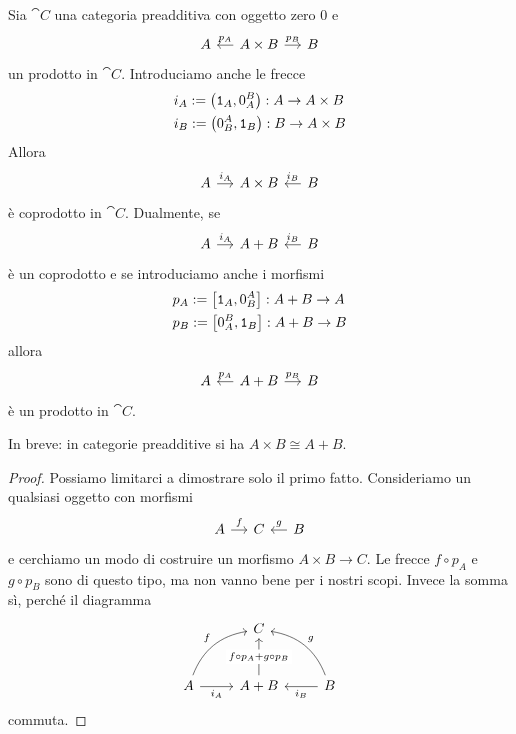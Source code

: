 \begin{proposition}\label{proposition:BinProdsAreBinCoprods}
  Sia \(\cat C\) una categoria preadditiva con oggetto zero \(0\) e
  \[
    \begin{tikzcd}[column sep=small]
      A & A \times B \ar["{p_A}", l, swap] \ar["{p_B}", r] & B
    \end{tikzcd}
  \]
  un prodotto in \(\cat C\).  Introduciamo anche le frecce
  \begin{equation}
    \label{eq:InjViaProj}
    \begin{aligned}
      & i_A := \left( \mathtt 1_A, 0_A^B \right) : A \to A \times B \\
      & i_B := \left( 0_B^A, \mathtt 1_B \right) : B \to A \times B
    \end{aligned}
  \end{equation}
  Allora
  \[
    \begin{tikzcd}[column sep=small]
      A \ar["{i_A}", r] & A \times B & B \ar["{i_B}", l, swap]
    \end{tikzcd}
  \]
  è coprodotto in \(\cat C\). Dualmente, se
  \[
    \begin{tikzcd}[column sep=small]
      A \ar["{i_A}", r] & A + B & B \ar["{i_B}", l, swap]
    \end{tikzcd}
  \]
  è un coprodotto e se introduciamo anche i morfismi
  \begin{equation}
    \label{eq:ProjViaInj}
    \begin{aligned}
      & p_A := \left[ \mathtt 1_A, 0_B^A \right] : A + B \to A \\
      & p_B := \left[ 0_A^B, \mathtt 1_B \right] : A + B \to B
    \end{aligned}
  \end{equation}
  allora
  \[
    \begin{tikzcd}[column sep=small]
      A & A + B \ar["{p_A}", l, swap] \ar["{p_B}", r] & B
    \end{tikzcd}
  \]
  è un prodotto in \(\cat C\).
\end{proposition}

In breve: in categorie preadditive si ha \(A \times B \cong A+B\).

\begin{proof}
  Possiamo limitarci a dimostrare solo il primo fatto. Consideriamo un
  qualsiasi oggetto con morfismi
  \[
    \begin{tikzcd}[column sep=small]
      A \ar["f", r] & C & B \ar["g", l, swap]
    \end{tikzcd}
  \]
  e cerchiamo un modo di costruire un morfismo \(A \times B \to C\). Le
  frecce \(f \circ p_A\) e \(g \circ p_B\) sono di questo tipo, ma non
  vanno bene per i nostri scopi. Invece la somma sì, perché il diagramma
  \[
    \begin{tikzcd}[row sep=large]
      & C \\
      A \ar["{i_A}", r, swap] \ar["f", ur, bend left] & A + B \ar["{f
        \circ p_A + g \circ p_B}" description, u] & B \ar["{i_B}", l]
      \ar["g", ul, bend right, swap]
    \end{tikzcd}
  \]
  commuta.
\end{proof}

